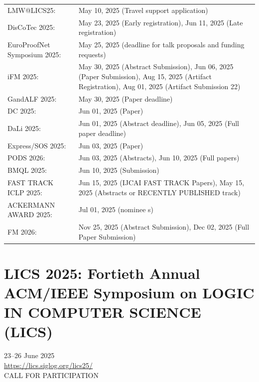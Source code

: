 \documentclass[prodmode,acmtecs]{acmsmall} %
\begin{document}
\begin{tabulary}{\linewidth}{LL}
LMW@LICS25:  & May 10, 2025 (Travel support application) \\
DisCoTec 2025:  & May 23, 2025 (Early registration), Jun 11, 2025 (Late registration) \\
EuroProofNet Symposium 2025:  & May 25, 2025 (deadline for talk proposals and funding requests) \\
iFM 2025:  & May 30, 2025 (Abstract Submission), Jun 06, 2025 (Paper Submission), Aug 15, 2025 (Artifact Registration), Aug 01, 2025 (Artifact Submission 22) \\
GandALF 2025:  & May 30, 2025 (Paper  deadline) \\
DC 2025:  & Jun 01, 2025 (Paper) \\
DaLi 2025:  & Jun 01, 2025 (Abstract deadline), Jun 05, 2025 (Full paper deadline) \\
Express/SOS 2025:  & Jun 03, 2025 (Paper) \\
PODS 2026:  & Jun 03, 2025 (Abstracts), Jun 10, 2025 (Full papers) \\
BMQL 2025:  & Jun 10, 2025 (Submission) \\
FAST TRACK ICLP 2025:  & Jun 15, 2025 (IJCAI FAST TRACK Papers), May 15, 2025 (Abstracts or RECENTLY PUBLISHED track) \\
ACKERMANN AWARD 2025:  & Jul 01, 2025 (nominee s) \\
FM 2026:  & Nov 25, 2025 (Abstract Submission), Dec 02, 2025 (Full Paper Submission) \\
\end{tabulary}
\section{LICS 2025: Fortieth Annual ACM/IEEE Symposium on LOGIC IN COMPUTER SCIENCE (LICS)}\label{LICS2025}  23–26 June 2025\\ 
  \href{https://lics.siglog.org/lics25/}{https://lics.siglog.org/lics25/}\\ 
CALL FOR PARTICIPATION 
\end{document}
